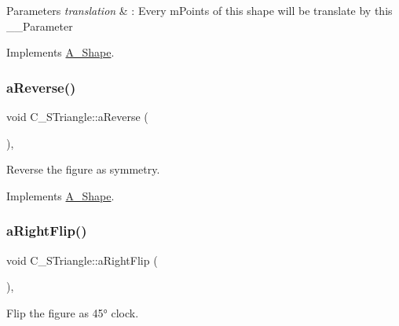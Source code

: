 \begin{DoxyParams}{Parameters}
{\em translation} & \+: Every m\+Points of this shape will be translate by this \+\_\+\+\_\+\+Parameter \\
\hline
\end{DoxyParams}


Implements \hyperlink{classA__Shape_ab284298db1b557ccfa7ba6de7a5fee2c}{A\+\_\+\+Shape}.

\mbox{\label{classC__STriangle_a5402899ec4ea0de3ca3e7aa6f184a1c7}} 
\subsubsection{\texorpdfstring{a\+Reverse()}{aReverse()}}
{\footnotesize\ttfamily void C\+\_\+\+S\+Triangle\+::a\+Reverse (\begin{DoxyParamCaption}{ }\end{DoxyParamCaption})\hspace{0.3cm}{\ttfamily [override]}, {\ttfamily [virtual]}}



Reverse the figure as symmetry. 



Implements \hyperlink{classA__Shape_afe2c7969d647f6358da13879a7534ecb}{A\+\_\+\+Shape}.

\mbox{\label{classC__STriangle_aa3cad7b7367c253000cf0f91f55ba600}} 
\subsubsection{\texorpdfstring{a\+Right\+Flip()}{aRightFlip()}}
{\footnotesize\ttfamily void C\+\_\+\+S\+Triangle\+::a\+Right\+Flip (\begin{DoxyParamCaption}{ }\end{DoxyParamCaption})\hspace{0.3cm}{\ttfamily [override]}, {\ttfamily [virtual]}}



Flip the figure as 45° clock. 



